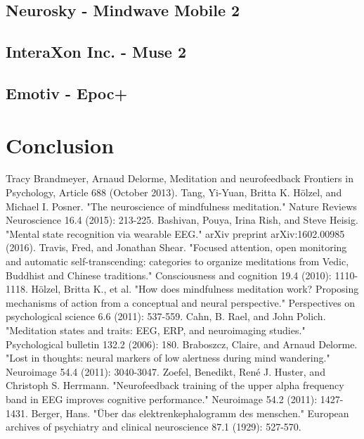 \documentclass{llncs} %
\begin{document}
\subsection{Neurosky - Mindwave Mobile 2}
\subsection{InteraXon Inc. - Muse 2}
\subsection{Emotiv - Epoc+}
\section{Conclusion}


\begin{thebibliography}{[MT1]}
    Tracy Brandmeyer, Arnaud Delorme,
    Meditation and neurofeedback
    Frontiers in Psychology, Article 688 (October 2013).
    Tang, Yi-Yuan, Britta K. Hölzel, and Michael I. Posner. "The neuroscience of mindfulness meditation." Nature Reviews Neuroscience 16.4 (2015): 213-225.
    Bashivan, Pouya, Irina Rish, and Steve Heisig. "Mental state recognition via wearable EEG." arXiv preprint arXiv:1602.00985 (2016).    
    Travis, Fred, and Jonathan Shear. "Focused attention, open monitoring and automatic self-transcending: categories to organize meditations from Vedic, Buddhist and Chinese traditions." Consciousness and cognition 19.4 (2010): 1110-1118.
    Hölzel, Britta K., et al. "How does mindfulness meditation work? Proposing mechanisms of action from a conceptual and neural perspective." Perspectives on psychological science 6.6 (2011): 537-559.
    Cahn, B. Rael, and John Polich. "Meditation states and traits: EEG, ERP, and neuroimaging studies." Psychological bulletin 132.2 (2006): 180.
    Braboszcz, Claire, and Arnaud Delorme. "Lost in thoughts: neural markers of low alertness during mind wandering." Neuroimage 54.4 (2011): 3040-3047.
    Zoefel, Benedikt, René J. Huster, and Christoph S. Herrmann. "Neurofeedback training of the upper alpha frequency band in EEG improves cognitive performance." Neuroimage 54.2 (2011): 1427-1431.
    Berger, Hans. "Über das elektrenkephalogramm des menschen." European archives of psychiatry and clinical neuroscience 87.1 (1929): 527-570.

\end{thebibliography}
\end{document}

